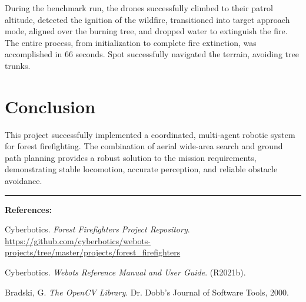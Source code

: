 \documentclass[11pt,a4paper]{article}
\begin{document}
During the benchmark run, the drones successfully climbed to their patrol altitude, detected the ignition of the wildfire, transitioned into target approach mode, aligned over the burning tree, and dropped water to extinguish the fire. The entire process, from initialization to complete fire extinction, was accomplished in 66 seconds. Spot successfully navigated the terrain, avoiding tree trunks.

\section{Conclusion}
This project successfully implemented a coordinated, multi-agent robotic system for forest firefighting. The combination of aerial wide-area search and ground path planning provides a robust solution to the mission requirements, demonstrating stable locomotion, accurate perception, and reliable obstacle avoidance.

\vspace{0.2cm}
\begin{center}
\rule{0.5\linewidth}{0.5pt}
\end{center}
\vspace{0.1cm}

\small
\textbf{References:}
\begin{enumerate}[label={[\arabic*]},leftmargin=1.8em]
  \item Cyberbotics. \textit{Forest Firefighters Project Repository}. \\ \url{https://github.com/cyberbotics/webots-projects/tree/master/projects/forest_firefighters}
  \item Cyberbotics. \textit{Webots Reference Manual and User Guide}. (R2021b).
  \item Bradski, G. \textit{The OpenCV Library}. Dr. Dobb's Journal of Software Tools, 2000.
\end{enumerate}
\end{document}
